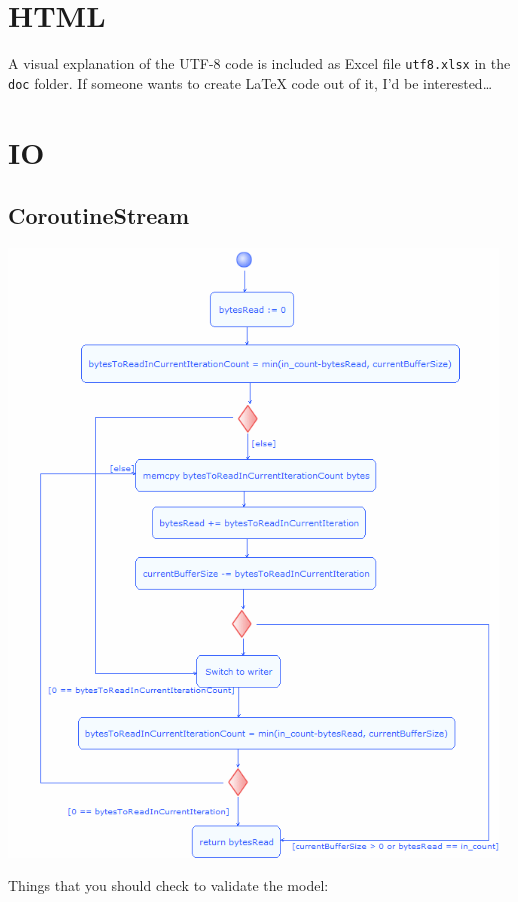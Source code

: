 \documentclass[10pt]{scrbook}
\begin{document}
\section{HTML}

A visual explanation of the UTF-8 code is included as Excel file \verb|utf8.xlsx| in the \verb|doc| folder. If someone wants to create LaTeX code out of it, I'd be interested\ldots

\section{IO}

\subsection{CoroutineStream}

\includegraphics[width=130mm]{uml/CoroutineStream_read_activity.png}

Things that you should check to validate the model:
\end{document}
